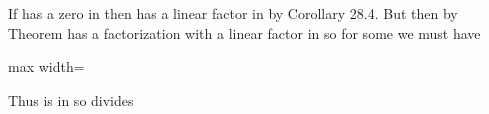 \documentclass[11pt,oneside]{article}
\begin{document}
\begin{BookBody}
 If  has a zero  in  then  has a linear factor  in  by Corollary 28.4. But then by Theorem  has a factorization with a linear factor in  so for some  we must have

\begin{center}\begin{adjustbox}{max width=\linewidth}\end{adjustbox}\end{center}

\noindent Thus  is in  so  divides  \BookEnd{\blacklozenge}

\end{BookBody}

\BookNarrativetrue
\end{document}
